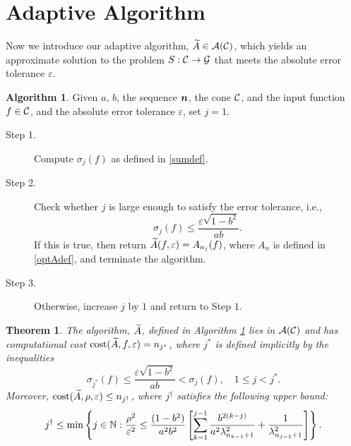 \documentclass[final]{elsarticle}
\newtheorem{theorem}{Theorem}
\theoremstyle{definition}
\newtheorem{algo}{Algorithm}
\theoremstyle{remark}
\newcommand{\optAn}{A_n}
\begin{document}
\section{Adaptive Algorithm} \label{sec:adaptalgo}

Now we introduce our adaptive algorithm, $\widetilde{A} \in \mathcal{A}(\mathcal{C})$, which yields an approximate solution to the problem $S:\mathcal{C}\rightarrow\mathcal{G}$ that meets the absolute error tolerance $\varepsilon$.

\begin{algo}\label{algo2}
Given $a$, $b$, the sequence $\boldsymbol{n}$, the cone $\mathcal{C}$, and the input function $f \in \mathcal{C}$, and the absolute error tolerance $\varepsilon$, set $j=1$.
\begin{description}
\item[Step 1.] Compute $\sigma_{j}(f)$ as defined in \eqref{sumdef}.
\item[Step 2.] Check whether $j$ is large enough to satisfy the error tolerance, i.e.,
    \begin{equation}\label{covcrit}
          \sigma_{j}(f) \le \frac{\varepsilon\sqrt{1 - b^2}}{ab} .
    \end{equation}
    If this is true, then return $\widetilde{A}(f,\varepsilon) = A_{n_{j}}(f)$, where $\optAn$ is defined in \eqref{optAdef}, and terminate the algorithm.
\item[Step 3.] Otherwise, increase $j$ by $1$ and return to Step $1$.
\end{description}
\end{algo}

\begin{theorem}\label{thm:compcost}
The algorithm, $\widetilde{A}$, defined in Algorithm \ref{algo2} lies in $\mathcal{A}(\mathcal{C})$ and has computational cost $\operatorname{cost}(\widetilde{A},f,\varepsilon)=n_{j^*}$, where $j^*$ is defined implicitly by the inequalities 
\[
\sigma_{j^*}(f) \le \frac{\varepsilon\sqrt{1 - b^2}}{ab}  < \sigma_{j}(f), \quad 1 \le j < j^*.
\]
Moreover, $\operatorname{cost}(\widetilde{A},\rho,\varepsilon) \le n_{j^\dagger}$, where $j^\dagger$ satisfies the following upper bound:
\begin{equation} \label{jdagger}
j^\dagger \le \min \left \{j \in \mathbb{N} : \frac{\rho^2}{\varepsilon^2} \le \frac{(1 - b^2)}{a^2b^2} \left[ \sum_{k=1}^{j-1} \frac{b^{2(k-j)}}{a^2\lambda_{n_{k-1}+1}^2} + \frac{1}{\lambda_{n_{j-1}+1}^2}\right]   \right\}.
\end{equation}

\end{theorem}
\end{document}
